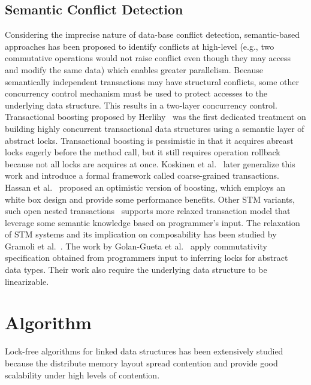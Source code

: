 \documentclass[10pt,conference,compsocconf]{IEEEtran}
\begin{document}
\subsection{Semantic Conflict Detection}
Considering the imprecise nature of data-base conflict detection, semantic-based approaches has been proposed to identify conflicts at high-level (e.g., two commutative operations would not raise conflict even though they may access and modify the same data) which enables greater parallelism.
Because semantically independent transactions may have structural conflicts, some other concurrency control mechanism must be used to protect accesses to the underlying data structure.
This results in a two-layer concurrency control.
Transactional boosting proposed by Herlihy~\cite{} was the first dedicated treatment on building highly concurrent transactional data structures using a semantic layer of abstract locks. 
Transactional boosting is pessimistic in that it acquires abreast locks eagerly before the method call, but it still requires operation rollback because not all locks are acquires at once.
Koskinen et al.~\cite{koskinen2010coarse} later generalize this work and introduce a formal framework called coarse-grained transactions.
Hassan et al.~\cite{hassan2014developing} proposed an optimistic version of boosting, which employs an white box design and provide some performance benefits.
Other STM variants, such open nested transactions~\cite{ni2007open} supports more relaxed transaction model that leverage some semantic knowledge based on programmer's input.
The relaxation of STM systems and its implication on composability has been studied by Gramoli et al.~\cite{gramoli2013composing}.
The work by Golan-Gueta et al.~\cite{golan2015automatic} apply commutativity specification obtained from programmers input to inferring locks for abstract data types.
Their work also require the underlying data structure to be linearizable.

\section{Algorithm}
\label{sec:algorithm}
Lock-free algorithms for linked data structures has been extensively studied because the distribute memory layout spread contention and provide good scalability under high levels of contention.
\end{document}
